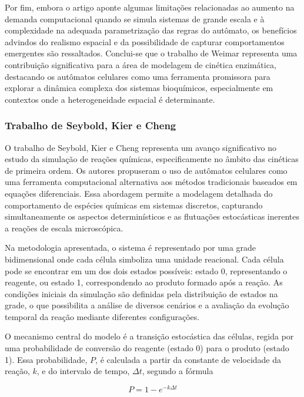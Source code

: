 \documentclass[12pt,oneside]{report}
\begin{document}
Por fim, embora o artigo aponte algumas limitações relacionadas ao aumento na demanda computacional quando se simula sistemas de grande escala e à complexidade na adequada parametrização das regras do autômato, os benefícios advindos do realismo espacial e da possibilidade de capturar comportamentos emergentes são ressaltados. Conclui-se que o trabalho de Weimar \cite{weimar2002cellular} representa uma contribuição significativa para a área de modelagem de cinética enzimática, destacando os autômatos celulares como uma ferramenta promissora para explorar a dinâmica complexa dos sistemas bioquímicos, especialmente em contextos onde a heterogeneidade espacial é determinante.

\subsubsection{Trabalho de Seybold, Kier e Cheng}

O trabalho de Seybold, Kier e Cheng \cite{seybold1997simulation} representa um avanço significativo no estudo da simulação de reações químicas, especificamente no âmbito das cinéticas de primeira ordem. Os autores propuseram o uso de autômatos celulares como uma ferramenta computacional alternativa aos métodos tradicionais baseados em equações diferenciais. Essa abordagem permite a modelagem detalhada do comportamento de espécies químicas em sistemas discretos, capturando simultaneamente os aspectos determinísticos e as flutuações estocásticas inerentes a reações de escala microscópica.

Na metodologia apresentada, o sistema é representado por uma grade bidimensional onde cada célula simboliza uma unidade reacional. Cada célula pode se encontrar em um dos dois estados possíveis: estado 0, representando o reagente, ou estado 1, correspondendo ao produto formado após a reação. As condições iniciais da simulação são definidas pela distribuição de estados na grade, o que possibilita a análise de diversos cenários e a avaliação da evolução temporal da reação mediante diferentes configurações.

O mecanismo central do modelo é a transição estocástica das células, regida por uma probabilidade de conversão do reagente (estado 0) para o produto (estado 1). Essa probabilidade, $P$, é calculada a partir da constante de velocidade da reação, $k$, e do intervalo de tempo, $\Delta t$, segundo a fórmula

\begin{equation}
    P = 1 - e^{-k \Delta t}
\end{equation}
\end{document}
